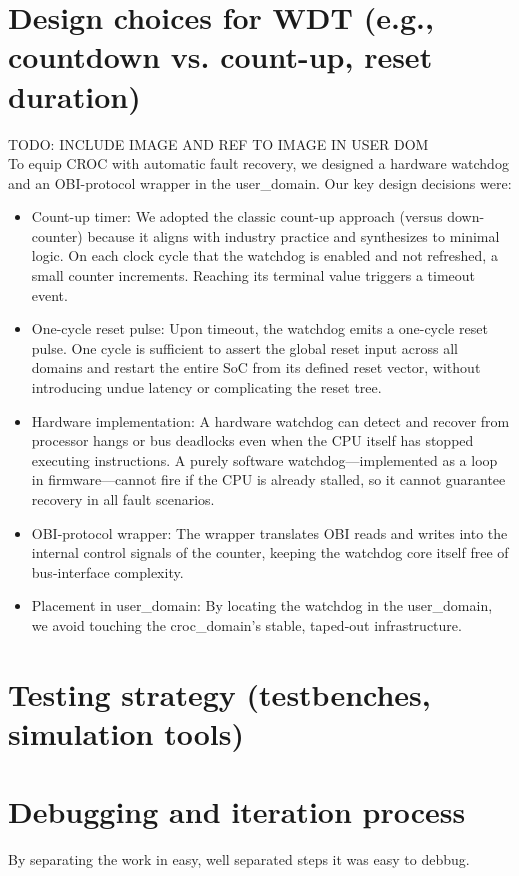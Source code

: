 \section{Design choices for WDT (e.g., countdown vs. count-up, reset duration)}
TODO: INCLUDE IMAGE AND REF TO IMAGE IN USER DOM
\\
To equip CROC with automatic fault recovery, we designed a hardware watchdog and an OBI-protocol wrapper in the user\_domain. Our key design decisions were:
\begin{itemize}
	\item{Count-up timer:} We adopted the classic count-up approach (versus down-counter) because it aligns with industry practice and synthesizes to minimal logic. On each clock cycle that the watchdog is enabled and not refreshed, a small counter increments. Reaching its terminal value triggers a timeout event.
  \item{One-cycle reset pulse:} Upon timeout, the watchdog emits a one-cycle reset pulse. One cycle is sufficient to assert the global reset input across all domains and restart the entire SoC from its defined reset vector, without introducing undue latency or complicating the reset tree.
  \item{Hardware implementation:} A hardware watchdog can detect and recover from processor hangs or bus deadlocks even when the CPU itself has stopped executing instructions. A purely software watchdog—implemented as a loop in firmware—cannot fire if the CPU is already stalled, so it cannot guarantee recovery in all fault scenarios.
  \item{OBI-protocol wrapper:} The wrapper translates OBI reads and writes into the internal control signals of the counter, keeping the watchdog core itself free of bus-interface complexity. 
  \item{Placement in user\_domain:} By locating the watchdog in the user\_domain, we avoid touching the croc\_domain’s stable, taped-out infrastructure.

\end{itemize}

\section{Testing strategy (testbenches, simulation tools)}

\section{Debugging and iteration process}
By separating the work in easy, well separated steps it was easy to debbug.

